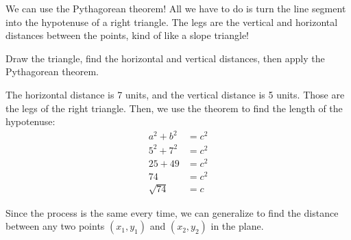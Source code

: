 We can use the Pythagorean theorem! All we have to do is turn the line segment into the hypotenuse of a right triangle. The legs are the vertical and horizontal distances between the points, kind of like a slope triangle!

Draw the triangle, find the horizontal and vertical distances, then apply the Pythagorean theorem.

\begin{center}
\end{center}

The horizontal distance is 7 units, and the vertical distance is 5 units. Those are the legs of the right triangle. Then, we use the theorem to find the length of the hypotenuse: \[\begin{aligned} a^2 + b^2 &= c^2 \\ 5^2 + 7^2 &= c^2 \\ 25 + 49 &= c^2 \\ 74 &= c^2 \\ \sqrt{74} &= c\end{aligned}\]

Since the process is the same every time, we can generalize to find the distance between any two points $(x_1, y_1)$ and $(x_2, y_2)$ in the plane.

